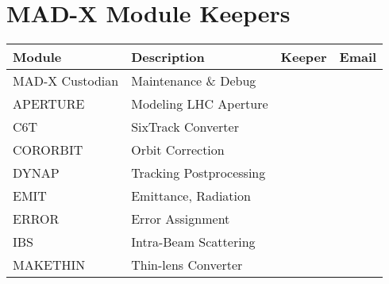 
\section{MAD-X Module Keepers} 

%
\begin{table}[H]\vspace*{-6mm}\footnotesize

\begin{tabular}{l|l|l|l}
\hline
\textbf{Module}    &\textbf{Description}        &\textbf{Keeper}                     &\textbf{Email}            	 \\\hline
MAD-X Custodian    &Maintenance \& Debug        &{\color{green}{tba}}                            & {\color{red}{}}         \\\hline
APERTURE           &Modeling LHC Aperture       &{\color{green}{J.B.~Jeanneret}}                 & {\color{red}{Bernard.Jeanneret@cern.ch}}   \\ \hline                
C6T                &SixTrack Converter          &{\color{green}{F.~Schmidt}}                     & {\color{red}{Frank.Schmidt@cern.ch}}       \\\hline
CORORBIT           &Orbit Correction            &{\color{green}{W.~Herr}}                        & {\color{red}{Werner.Herr@cern.ch}}         \\\hline
DYNAP              &Tracking Postprocessing     &{\color{green}{F.~Zimmermann}}                  & {\color{red}{Frank.Zimmermann@cern.ch}}    \\\hline
EMIT               &Emittance, Radiation        &{\color{green}{R ~Tom\'as}}                     & {\color{red}{Rogelio.Tomas@cern.ch}}       \\\hline
ERROR              &Error Assignment            &{\color{green}{W.~Herr}}                        & {\color{red}{Werner.Herr@cern.ch}}         \\\hline
IBS                &Intra-Beam Scattering       &{\color{green}{F.~Zimmermann}}                  & {\color{red}{Frank.Zimmermann@cern.ch}}    \\\hline
MAKETHIN           &Thin-lens Converter         &{\color{green}{H.~Burkhardt}}                   & {\color{red}{Helmut.Burkhardt@cern.ch}}    \\\hline

\end{tabular}
\end{table}
